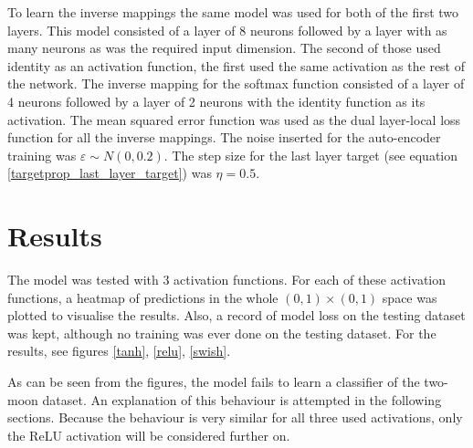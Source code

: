 To learn the inverse mappings the same model was used for both of the first two layers. This model consisted of a layer of 8 neurons followed by a layer with as many neurons as was the required input dimension. The second of those used identity as an activation function, the first used the same activation as the rest of the network. The inverse mapping for the softmax function consisted of a layer of 4 neurons followed by a layer of 2 neurons with the identity function as its activation. The mean squared error function was used as the dual layer-local loss function for all the inverse mappings. The noise inserted for the auto-encoder training was \( \varepsilon \sim N \left( 0, 0.2 \right) \). The step size for the last layer target (see equation \ref{targetprop_last_layer_target}) was \( \eta = 0.5 \).

\section{Results}

The model was tested with 3 activation functions. For each of these activation functions, a heatmap of predictions in the whole \( \left( 0, 1 \right) \times \left( 0, 1 \right) \) space was plotted to visualise the results. Also, a record of model loss on the testing dataset was kept, although no training was ever done on the testing dataset. For the results, see figures \ref{tanh}, \ref{relu}, \ref{swish}.

As can be seen from the figures, the model fails to learn a classifier of the two-moon dataset. An explanation of this behaviour is attempted in the following sections. Because the behaviour is very similar for all three used activations, only the ReLU activation will be considered further on.

